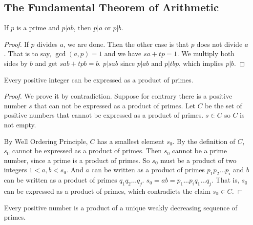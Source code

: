 \documentclass[11pt]{article}
\begin{document}
\subsection{The Fundamental Theorem of Arithmetic}

\begin{lemma}
If $p$ is a prime and $p|ab$, then $p|a$ or $p|b$.
\end{lemma}

\begin{proof}
If $p$ divides $a$, we are done. Then the other case is that $p$ does not divide $a$. That
is to say, $\gcd(a,p)=1$ and we have $sa+tp=1$. We multiply both sides by $b$ and get
$sab+tpb=b$. $p|sab$ since $p|ab$ and $p|tbp$, which implies $p|b$.
\end{proof}

\begin{lemma} \label{lemma:9}
Every positive integer can be expressed as a product of primes.
\end{lemma}

\begin{proof}
We prove it by contradiction. Suppose for contrary there is a positive number $s$ that can
not be expressed as a product of primes. Let $C$ be the set of positive numbers that cannot
be expressed as a product of primes. $s \in C$ so $C$ is not empty.

By Well Ordering Principle, $C$ has a smallest element $s_0$. By the definition of $C$,
$s_0$ cannot be expressed as a product of primes. Then $s_0$ cannot be a prime number, since
a prime is a product of primes. So $s_0$ must be a product of two integers $1 < a,b < s_0$.
And $a$ can be written as a product of primes $p_1p_2 \dots p_i$ and $b$ can be written as a
product of primes $q_1q_2 \dots q_j$. $s_0 = ab = p_1 \dots p_iq_1 \dots q_j$. That is,
$s_0$ can be expressed as a product of primes, which contradicts the claim $s_0 \in C$.
\end{proof}

\begin{theorem}
Every positive number is a product of a unique weakly decreasing sequence of primes.
\end{theorem}
\end{document}
